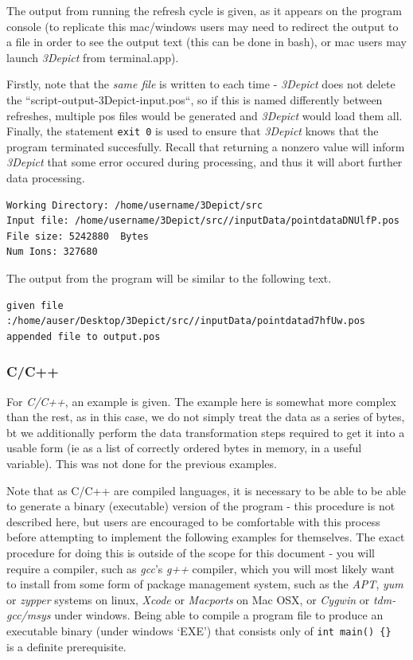 \documentclass[10pt]{article}
\begin{document}
The output from running the refresh cycle is given, as it appears on the program console (to replicate this mac/windows users may need to redirect the output to a file in order to see the output text (this can be done in bash), or mac users may launch \emph{3Depict} from terminal.app).

Firstly, note that the \emph{same file} is written to each time - \emph{3Depict} does not delete the ``script-output-3Depict-input.pos``, so if this is named differently between refreshes, multiple pos files would be generated and \emph{3Depict} would load them all. Finally, the statement \texttt{exit 0} is used to ensure that \emph{3Depict} knows that the program terminated succesfully. Recall that returning a nonzero value will inform \emph{3Depict} that some error occured during processing, and thus it will abort further data processing.

\begin{verbatim}
Working Directory: /home/username/3Depict/src
Input file: /home/username/3Depict/src//inputData/pointdataDNUlfP.pos
File size: 5242880  Bytes
Num Ions: 327680
\end{verbatim}

The output from the program will be similar to the following text.
\begin{verbatim}
given file :/home/auser/Desktop/3Depict/src//inputData/pointdatad7hfUw.pos
appended file to output.pos
\end{verbatim}

\subsubsection{C/C++}
For \emph{C/C++}, an example is given. The example here is somewhat more complex than the rest, as in this case, we do not simply treat the data as a series of bytes, bt we additionally perform the data transformation steps required to get it into a usable form (ie as a list of correctly ordered bytes in memory, in a useful variable). This was not done for the previous examples.

Note that as C/C++ are compiled languages, it is necessary to be able to be able to generate a binary (executable) version of the program - this procedure is not described here, but users are encouraged to be comfortable with this process before attempting to implement the following examples for themselves. The exact procedure for doing this is outside of the scope for this document - you will require a compiler, such as \emph{gcc}'s \emph{g++} compiler, which you will most likely want to install from some form of package management system, such as the \emph{APT}, \emph{yum} or \emph{zypper} systems on linux, \emph{Xcode} or \emph{Macports} on Mac OSX, or \emph{Cygwin} or \emph{tdm-gcc/msys} under windows. Being able to compile a program file to produce an executable binary (under windows `EXE') that consists only of \texttt{int main() \{\} } is a definite prerequisite.
\end{document}

